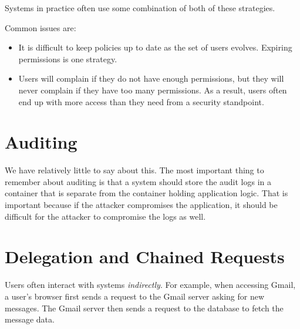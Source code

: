 \documentclass[
  letterpaper,
]{scrbook}
\providecommand{\tightlist}{%
  \setlength{\itemsep}{0pt}\setlength{\parskip}{0pt}}
\theoremstyle{definition}
\theoremstyle{plain}
\theoremstyle{plain}
\theoremstyle{remark}
\begin{document}
Systems in practice often use some combination of both of these
strategies.


Common issues are:

\begin{itemize}
\tightlist
\item
  It is difficult to keep policies up to date as the set of users
  evolves. Expiring permissions is one strategy.
\item
  Users will complain if they do not have enough permissions, but they
  will never complain if they have too many permissions. As a result,
  users often end up with more access than they need from a security
  standpoint.
\end{itemize}

\section{Auditing}\label{auditing}

We have relatively little to say about this. The most important thing to
remember about auditing is that a system should store the audit logs in
a container that is separate from the container holding application
logic. That is important because if the attacker compromises the
application, it should be difficult for the attacker to compromise the
logs as well.

\section{Delegation and Chained
Requests}\label{delegation-and-chained-requests}

Users often interact with systems \emph{indirectly}. For example, when
accessing Gmail, a user's browser first sends a request to the Gmail
server asking for new messages. The Gmail server then sends a request to
the database to fetch the message data.
\end{document}
